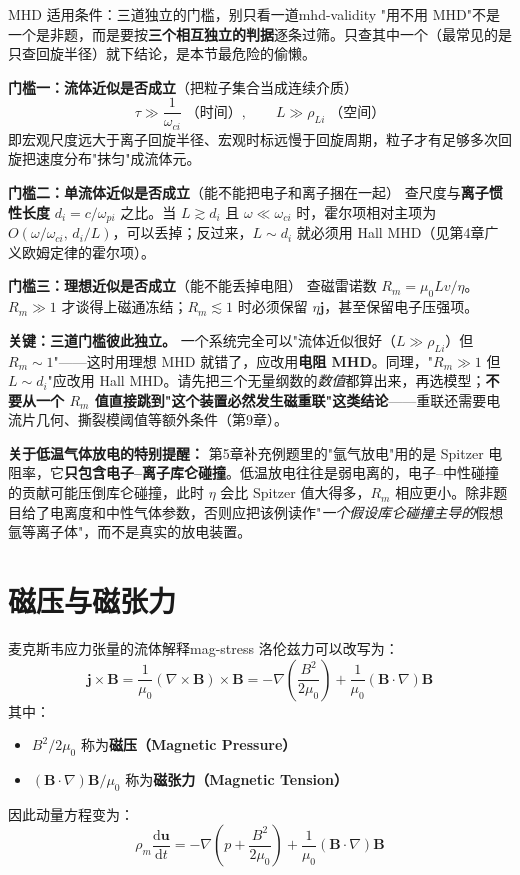 \documentclass[12pt,a4paper,openany,oneside]{book}
\newcommand{\diff}{\mathrm{d}}
\newcommand{\vect}[1]{\bm{#1}}
\newcommand{\grad}{\nabla}
\newcommand{\curl}{\nabla\times}
\newcommand{\difficulty}[1]{\marginnote{\hfill\textcolor{coverMid!80}{\rule[-0.1em]{2pt}{0.9em}}\,\textcolor{coverMid}{\footnotesize\textbf{[#1]}}}}
\begin{document}
\begin{warning}{MHD 适用条件：三道独立的门槛，别只看一道}{mhd-validity}
"用不用 MHD"不是一个是非题，而是要按\textbf{三个相互独立的判据}逐条过筛。只查其中一个（最常见的是只查回旋半径）就下结论，是本节最危险的偷懒。

\textbf{门槛一：流体近似是否成立}（把粒子集合当成连续介质）
\[
\tau \gg \frac{1}{\omega_{ci}}\;\text{（时间）}, \qquad L \gg \rho_{Li}\;\text{（空间）}
\]
即宏观尺度远大于离子回旋半径、宏观时标远慢于回旋周期，粒子才有足够多次回旋把速度分布"抹匀"成流体元。

\textbf{门槛二：单流体近似是否成立}（能不能把电子和离子捆在一起）
查尺度与\textbf{离子惯性长度} $d_i=c/\omega_{pi}$ 之比。当 $L\gtrsim d_i$ 且 $\omega\ll\omega_{ci}$ 时，霍尔项相对主项为 $O(\omega/\omega_{ci},\,d_i/L)$，可以丢掉；反过来，$L\sim d_i$ 就必须用 Hall MHD（见第4章广义欧姆定律的霍尔项）。

\textbf{门槛三：理想近似是否成立}（能不能丢掉电阻）
查磁雷诺数 $R_m=\mu_0 Lv/\eta$。$R_m\gg1$ 才谈得上磁通冻结；$R_m\lesssim1$ 时必须保留 $\eta\vect{j}$，甚至保留电子压强项。

\textbf{关键：三道门槛彼此独立。} 一个系统完全可以"流体近似很好（$L\gg\rho_{Li}$）但 $R_m\sim1$"——这时用理想 MHD 就错了，应改用\textbf{电阻 MHD}。同理，"$R_m\gg1$ 但 $L\sim d_i$"应改用 Hall MHD。请先把三个无量纲数的\emph{数值}都算出来，再选模型；\textbf{不要从一个 $R_m$ 值直接跳到"这个装置必然发生磁重联"这类结论}——重联还需要电流片几何、撕裂模阈值等额外条件（第9章）。

\textbf{关于低温气体放电的特别提醒：} 第5章补充例题里的"氩气放电"用的是 Spitzer 电阻率，它\textbf{只包含电子--离子库仑碰撞}。低温放电往往是弱电离的，电子--中性碰撞的贡献可能压倒库仑碰撞，此时 $\eta$ 会比 Spitzer 值大得多，$R_m$ 相应更小。除非题目给了电离度和中性气体参数，否则应把该例读作"\emph{一个假设库仑碰撞主导的}假想氩等离子体"，而不是真实的放电装置。
\end{warning}

\section{磁压与磁张力}\difficulty{基础}

\begin{theorem}{麦克斯韦应力张量的流体解释}{mag-stress}
洛伦兹力可以改写为：
\[
\vect{j}\times\vect{B} = \frac{1}{\mu_0}(\curl\vect{B})\times\vect{B} = -\grad\left(\frac{B^2}{2\mu_0}\right) + \frac{1}{\mu_0}(\vect{B}\cdot\grad)\vect{B}
\]
其中：
\begin{itemize}
\item $B^2/2\mu_0$ 称为\textbf{磁压（Magnetic Pressure）}
\item $(\vect{B}\cdot\grad)\vect{B}/\mu_0$ 称为\textbf{磁张力（Magnetic Tension）}
\end{itemize}

因此动量方程变为：
\[
\rho_m\frac{\diff\vect{u}}{\diff t} = -\grad\left(p + \frac{B^2}{2\mu_0}\right) + \frac{1}{\mu_0}(\vect{B}\cdot\grad)\vect{B}
\]
\end{theorem}
\end{document}
